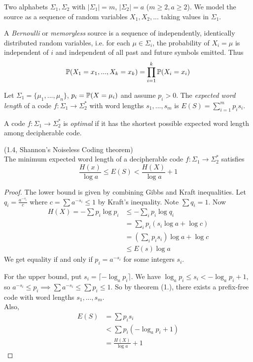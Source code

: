\documentclass[a4paper]{article}
\begin{document}
Two alphabets $\Sigma_1,\Sigma_2$ with $|\Sigma_1| =m$, $|\Sigma_2| = a$ ($m \geq 2, a \geq 2$). We model the source as a sequence of random variables $X_1,X_2,...$ taking values in $\Sigma_1$.

\begin{defi}
A \emph{Bernoulli} or \emph{memoryless} source is a sequence of independently, identically distributed random variables, i.e. for each $\mu \in \Sigma_i$, the probability of $X_i = \mu$ is independent of $i$ and independent of all past and future symbols emitted. Thus $$\P(X_1=x_1,...,X_k = x_k) = \prod_{i=1}^k \P(X_i = x_i)$$

Let $\Sigma_1 =\{\mu_1,...,\mu_n\}$, $p_i = \P(X =\mu_i)$ and assume $p_i > 0$. The \emph{expected word length} of a code $f:\Sigma_1 \to \Sigma^*_2$ with word lengths $s_1,...,s_m$ is $E(S) = \sum_{i=1}^m p_i s_i$.
\end{defi}

\begin{defi}
A code $f:\Sigma_1 \to \Sigma^*_2$ is \emph{optimal} if it has the shortest possible expected word length among decipherable code.
\end{defi}

\begin{thm} (1.4, Shannon's Noiseless Coding theorem)\\
The minimum expected word length of a decipherable code $f:\Sigma_1\to \Sigma^*_2$ satisfies $$\frac{H(x)}{\log a} \leq E(S) < \frac{H(X)}{\log a} + 1$$
\begin{proof}
The lower bound is given by combining Gibbs and Kraft inequalities. Let $q_i = \frac{a^{-s_i}}{c}$ where $c = \sum a^{-s_i} \leq 1$ by Kraft's inequality. Note $\sum q_i = 1$. Now 
\begin{equation*}
\begin{aligned}
H(X) = -\sum p_i \log p_i &\leq -\sum_i p_i \log q_i \\
&= \sum_i p_i (s_i \log a + \log c)\\
&= (\sum_i p_i s_i) \log a + \log c\\
&\leq E(s) \log a
\end{aligned}
\end{equation*}
We get equality if and only if $p_i = a^{-s_i}$ for some integers $s_i$.

For the upper bound, put $s_i = \lceil -\log_a p_i \rceil$. We have $\log_a p_i \leq s_i < -\log_a p_i +1$, so $a^{-s_i} \leq p_i \implies \sum a^{-s_i} \leq \sum p_i \leq 1$. So by theorem (1.), there exists a prefix-free code with word lengths $s_1,...,s_m$.\\
Also,
\begin{equation*}
\begin{aligned}
E(S) &= \sum p_i s_i\\
&< \sum p_i (-\log_a p_i + 1)\\
&= \frac{H(X)}{\log a} + 1
\end{aligned}
\end{equation*}
\end{proof}
\end{thm}
\end{document}
